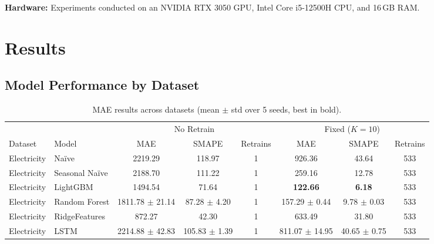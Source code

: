 \documentclass[conference]{IEEEtran}
\begin{document}
\textbf{Hardware:} Experiments conducted on an NVIDIA RTX 3050 GPU,
Intel Core i5-12500H CPU, and 16\,GB RAM.

\section{Results}

\subsection{Model Performance by Dataset}

\begin{table}[!t]
	\centering
	\small
	\caption{MAE results across datasets (mean $\pm$ std over 5 seeds, best in bold).}
	\label{tab:results}
	\begin{tabular}{ll|ccc|ccc}
		\toprule
		            &                        & \multicolumn{3}{c}{No Retrain} & \multicolumn{3}{c}{Fixed ($K=10$)}                                                                \\
		Dataset     & Model                  & MAE                            & SMAPE                              & Retrains & MAE                 & SMAPE            & Retrains \\
		\midrule
		Electricity & Na\"{i}ve              & 2219.29                        & 118.97                             & 1        & 926.36              & 43.64            & 533      \\
		Electricity & Seasonal Na\"{i}ve     & 2188.70                        & 111.22                             & 1        & 259.16              & 12.78            & 533      \\
		Electricity & LightGBM               & 1494.54                        & 71.64                              & 1        & \textbf{122.66}     & \textbf{6.18}    & 533      \\
		Electricity & Random Forest          & 1811.78 $\pm$ 21.14            & 87.28 $\pm$ 4.20                   & 1        & 157.29 $\pm$ 0.44   & 9.78 $\pm$ 0.03  & 533      \\
		Electricity & RidgeFeatures          & 872.27                         & 42.30                              & 1        & 633.49              & 31.80            & 533      \\
		Electricity & LSTM                   & 2214.88 $\pm$ 42.83            & 105.83 $\pm$ 1.39                  & 1        & 811.07 $\pm$ 14.95  & 40.65 $\pm$ 0.75 & 533      \\

\end{tabular}
\end{table}
\end{document}
